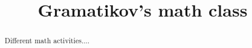 \documentclass{xourse}
\title{Gramatikov's math class}
\begin{document}
  
\begin{abstract} %
Different math activities....
\end{abstract}  
\maketitle  
 
 
\end{document}
